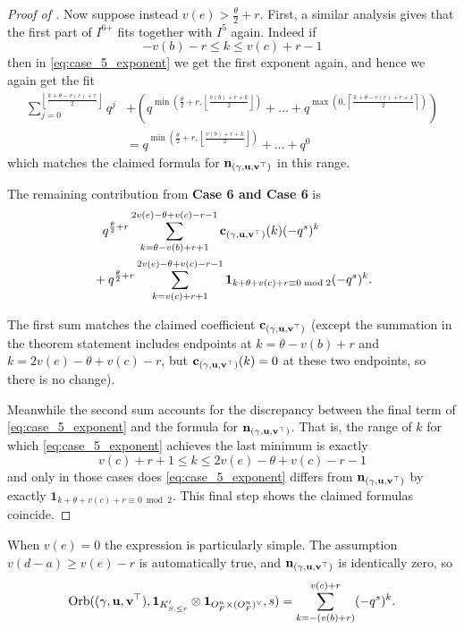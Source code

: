 \begin{proof}[Proof of ]
  Now suppose instead $v(e) > \frac{\theta}{2} + r$.
  First, a similar analysis gives that the first part of $I^{\text{6+}}$ fits
  together with $I^{\text{5}}$ again.
  Indeed if
  \[ -v(b) - r \le k \le v(c) + r - 1 \]
  then in \eqref{eq:case_5_exponent} we get the first exponent again, and hence
  we again get the fit
  \begin{align*}
    \sum_{j=0}^{\left\lfloor \frac{k+\theta-v(c)+r}{2} \right\rfloor} q^j
    &+
    \left(
    q^{\min\left( \frac{\theta}{2} + r, \left\lfloor \frac{v(b) + r + k}{2} \right\rfloor \right)}
    + \dots
    + q^{\max\left(0, \left\lceil \frac{k + \theta - v(c) + r + 1}{2} \right\rceil \right)}
    \right) \\
    &=
    q^{\min(\frac{\theta}{2}+r, \left\lfloor \frac{v(b) + r + k}{2} \right\rfloor)} + \dots + q^0
  \end{align*}
  which matches the claimed formula for $\mathbf n_{(\gamma, \mathbf u, \mathbf v^\top)}$ in this range.

  The remaining contribution from \textbf{Case 6\ts{+} and Case 6\ts{-}} is
  \begin{align*}
  &\phantom+ q^{\frac{\theta}{2} + r}
  \sum_{k = \theta - v(b) + r + 1}^{2v(e) - \theta + v(c) - r - 1} \cc_\guv(k)(-q^s)^k \\
  &+ q^{\frac{\theta}{2} + r}
  \sum_{k = v(c) + r + 1}^{2v(e) - \theta + v(c) - r - 1}
  \mathbf{1}_{k + \theta + v(c) + r \equiv 0 \bmod 2} (-q^s)^k.
  \end{align*}

  The first sum matches the claimed coefficient $\mathbf c_{(\gamma, \mathbf u, \mathbf v^\top)}$
  (except the summation in the theorem statement includes
  endpoints at $k = \theta - v(b) + r$
  and $k = 2v(e) - \theta + v(c) - r$,
  but $\mathbf c_{(\gamma, \mathbf u, \mathbf v^\top)}(k) = 0$ at these two endpoints,
  so there is no change).

  Meanwhile the second sum accounts for the discrepancy between
  the final term of \eqref{eq:case_5_exponent} and the formula for $\mathbf n_{(\gamma, \mathbf u, \mathbf v^\top)}$.
  That is, the range of $k$ for which \eqref{eq:case_5_exponent}
  achieves the last minimum is exactly
  \[ v(c) + r + 1 \le k \le 2v(e) - \theta + v(c) - r - 1 \]
  and only in those cases does \eqref{eq:case_5_exponent}
  differs from $\mathbf n_{(\gamma, \mathbf u, \mathbf v^\top)}$ by exactly
  $\mathbf{1}_{k + \theta + v(c) + r \equiv 0 \bmod 2}$.
  This final step shows the claimed formulas coincide.
\end{proof}

\begin{example}
  [The special case $v(e)=0$]
  When $v(e) = 0$ the expression is particularly simple.
  The assumption $v(d-a) \ge v(e)-r$ is automatically true, and
  $\mathbf n_{{(\gamma, \mathbf u, \mathbf v^\top)}}$ is identically zero, so
  \[ \operatorname{Orb}({(\gamma, \mathbf u, \mathbf v^\top)}, \mathbf{1}_{K'_{S, \le r}} \otimes \mathbf{1}_{O_F^n \times (O_F^n)^\vee}, s)
    = \sum_{k=-(v(b)+r)}^{v(c)+r} (-q^s)^k. \]
\end{example}

